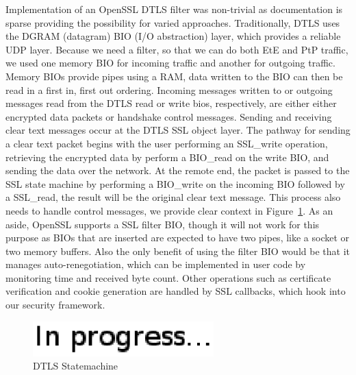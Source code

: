 \documentclass[conference]{IEEEtran}
\begin{document}
Implementation of an OpenSSL DTLS filter was non-trivial as documentation is
sparse providing the possibility for varied approaches.  Traditionally, DTLS
uses the DGRAM (datagram) BIO (I/O abstraction) layer, which provides a reliable
UDP layer.  Because we need a filter, so that we can do both EtE and PtP traffic,
we used one memory BIO  for incoming traffic and another for outgoing traffic.
Memory BIOs provide pipes using a RAM, data written to the BIO can then be read
in a first in, first out ordering.  Incoming messages written to or outgoing
messages read from the DTLS read or write bios, respectively, are either 
either encrypted data packets or handshake control messages.  Sending and 
receiving clear text messages occur at the DTLS SSL object layer.  The pathway
for sending a clear text packet begins with the user performing an SSL\_write
operation, retrieving the encrypted data by perform a BIO\_read on the write
BIO, and sending the data over the network.  At the remote end, the packet is
passed to the SSL state machine by performing a BIO\_write on the incoming BIO
followed by a SSL\_read, the result will be the original clear text message.
This process also needs to handle control messages, we provide clear context in
Figure~\ref{fig:dtls_statemachine}.  As an aside, OpenSSL supports a SSL filter
BIO, though it will not work for this purpose as BIOs that are inserted are
expected to have two pipes, like a socket or two memory buffers.  Also the only
benefit of using the filter BIO would be that it manages auto-renegotiation,
which can be implemented in user code by monitoring time and received byte
count.  Other operations such as certificate verification and cookie generation
are handled by SSL callbacks, which hook into our security framework.

\begin{figure}[h]
\centering
\includegraphics[width=2.75in]{in_progress.eps}
\caption{DTLS Statemachine}
\label{fig:dtls_statemachine}
\end{figure}
\end{document}
